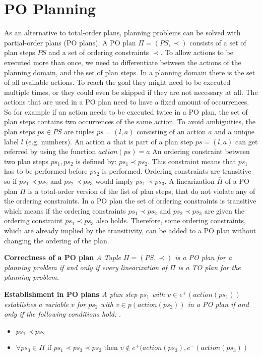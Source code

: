 \section{PO Planning}
As an alternative to total-order plans, planning problems can be solved with partial-order plans (PO plans). A PO plan $\Pi=(PS,\prec)$ consists of a 
set of plan steps $PS$ and a set of ordering constraints $ \prec $. To allow actions to be executed more than once, we
need to differentiate between the actions of the planning domain, and the set of plan steps. In a planning domain there is the set of all
available actions. To reach the goal they might need to be executed multiple times, or they could even be skipped if they are not necessary at all. The actions that are 
used in a PO plan need to have a fixed amount of occurrences. So for example if an action needs to be executed twice in a PO plan, the set of plan steps contains 
two occurrences of the same action. To avoid ambiguities, the plan steps $ps \in PS$ are tuples 
$ps=(l,a)$ consisting of an action $a$ and a unique label $l$ (e.g. numbers). 
An action $a$ that is part of a plan step $ps=(l,a)$ can get referred by using the function $action(ps)=a$
An ordering constraint between two plan steps $ps_1,ps_2$ is defined by: $ps_1 \prec ps_2$. This constraint means that $ps_1$ has to be performed before $ps_2$ is performed. Ordering constraints are transitive 
so if $ps_1 \prec ps_2$ and $ps_2 \prec ps_3$ would imply $ps_1 \prec ps_3$. A linearization $\overline{\Pi}$ of a PO plan $\Pi$ is a total-order version of the list of plan steps, that do not violate any of the ordering constraints.
In a PO plan the set of ordering constraints is transitive which means if the ordering constraints $ps_1 \prec ps_2$ and $ps_2 \prec ps_3$ are given the ordering constraint $ps_1 \prec ps_3$ also holds.
Therefore, some ordering constraints, which are already implied by the transitivity, can be added to a PO plan without changing the ordering of the plan.

\begin{Definition}
  \normalfont \textbf{Correctness of a PO plan}
  \textit{
    A Tuple $\Pi=(PS,\prec)$ is a PO plan for a planning problem if and only if every linearization of $\Pi$ is a TO plan for the planning problem.
  }
\end{Definition}
\begin{Definition}
  \normalfont \textbf{Establishment in PO plans \cite{Knoblock}}
  \textit{
    A plan step $ps_1$ with $v \in e^+(action(ps_1))$ establishes a variable $v$ for $ps_2$ with $v \in p(action(ps_2))$ in a PO plan
    if and only if the following conditions hold:
  }.
  \begin{itemize}
    \item  \textit{$ps_1 \prec ps_2$}
    \item  \textit{$\forall ps_3 \in \Pi \text{ if } ps_1 \prec ps_3 \prec ps_2 \text{ then } v \notin e^+(action(ps_3), e^-(action(ps_3))$}
  \end{itemize}

\end{Definition}

